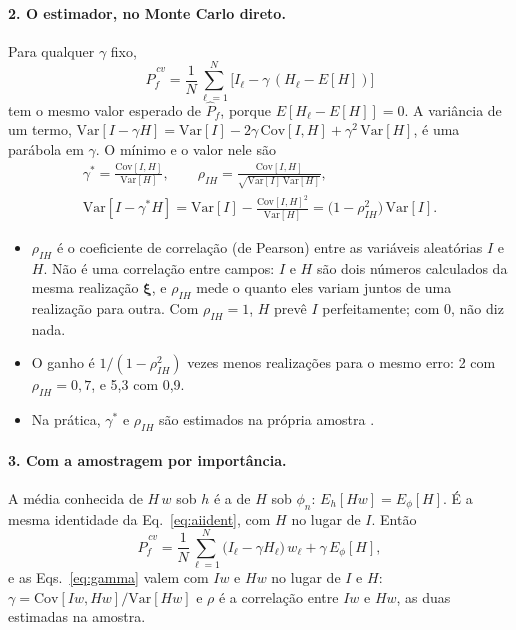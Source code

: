 \documentclass[11pt,a4paper]{article}
\newcommand{\xib}{\bm\xi}
\begin{document}
\paragraph{2. O estimador, no Monte Carlo direto.} Para qualquer $\gamma$ fixo,
\begin{equation}
  \hat P_f^{\,cv} = \frac{1}{N}\sum_{\ell=1}^{N}\big[I_\ell - \gamma\,(H_\ell - E[H])\big]
  \label{eq:cv}
\end{equation}
tem o mesmo valor esperado de $\hat P_f$, porque $E[H_\ell - E[H]] = 0$. A variância de um termo,
$\mathrm{Var}[I - \gamma H] = \mathrm{Var}[I] - 2\gamma\,\mathrm{Cov}[I, H] + \gamma^2\,\mathrm{Var}[H]$, é uma parábola
em $\gamma$. O mínimo e o valor nele são
\begin{equation}
  \begin{gathered}
  \gamma^* = \frac{\mathrm{Cov}[I, H]}{\mathrm{Var}[H]}, \qquad
  \rho_{IH} = \frac{\mathrm{Cov}[I, H]}{\sqrt{\mathrm{Var}[I]\,\mathrm{Var}[H]}},\\
  \mathrm{Var}[I - \gamma^* H] = \mathrm{Var}[I] - \frac{\mathrm{Cov}[I, H]^2}{\mathrm{Var}[H]}
  = \big(1 - \rho_{IH}^2\big)\,\mathrm{Var}[I].
  \end{gathered}
  \label{eq:gamma}
\end{equation}
\begin{itemize}
  \item $\rho_{IH}$ é o coeficiente de correlação (de Pearson) entre as variáveis aleatórias $I$ e $H$. Não é uma
    correlação entre campos: $I$ e $H$ são dois números calculados da mesma realização $\xib$, e $\rho_{IH}$ mede o quanto
    eles variam juntos de uma realização para outra. Com $\rho_{IH} = 1$, $H$ prevê $I$ perfeitamente; com 0, não diz
    nada.
  \item O ganho é $1/(1 - \rho_{IH}^2)$ vezes menos realizações para o mesmo erro: 2 com $\rho_{IH} = 0{,}7$, e 5,3 com
    0,9.
  \item Na prática, $\gamma^*$ e $\rho_{IH}$ são estimados na própria amostra \citep[Seç.~4.1.1]{glasserman2004}.
\end{itemize}

\paragraph{3. Com a amostragem por importância.} A média conhecida de $H\,w$ sob $h$ é a de $H$ sob $\phi_n$:
$E_h[H w] = E_\phi[H]$. É a mesma identidade da Eq.~\eqref{eq:aiident}, com $H$ no lugar de $I$. Então
\begin{equation}
  \hat P_f^{\,cv} = \frac{1}{N}\sum_{\ell=1}^{N}\big(I_\ell - \gamma H_\ell\big)\,w_\ell + \gamma\,E_\phi[H],
  \label{eq:cvai}
\end{equation}
e as Eqs.~\eqref{eq:gamma} valem com $I w$ e $H w$ no lugar de $I$ e $H$: $\gamma = \mathrm{Cov}[Iw, Hw]/\mathrm{Var}[Hw]$
e $\rho$ é a correlação entre $Iw$ e $Hw$, as duas estimadas na amostra.
\end{document}
